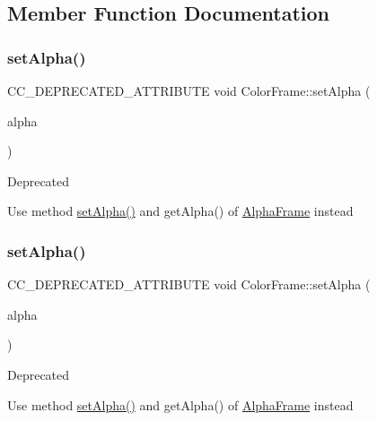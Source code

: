 \subsection{Member Function Documentation}
\mbox{\label{classColorFrame_a9ff6186646bd482ba3d4fe0e242739d6}} 
\subsubsection{\texorpdfstring{set\+Alpha()}{setAlpha()}\hspace{0.1cm}{\footnotesize\ttfamily [1/2]}}
{\footnotesize\ttfamily C\+C\+\_\+\+D\+E\+P\+R\+E\+C\+A\+T\+E\+D\+\_\+\+A\+T\+T\+R\+I\+B\+U\+TE void Color\+Frame\+::set\+Alpha (\begin{DoxyParamCaption}\item[{G\+Lubyte}]{alpha }\end{DoxyParamCaption})\hspace{0.3cm}{\ttfamily [inline]}}

\begin{DoxyRefDesc}{Deprecated}
\item[\hyperlink{deprecated__deprecated000074}{Deprecated}]Use method \hyperlink{classColorFrame_a9ff6186646bd482ba3d4fe0e242739d6}{set\+Alpha()} and get\+Alpha() of \hyperlink{classAlphaFrame}{Alpha\+Frame} instead \end{DoxyRefDesc}
\mbox{\label{classColorFrame_a9ff6186646bd482ba3d4fe0e242739d6}} 
\subsubsection{\texorpdfstring{set\+Alpha()}{setAlpha()}\hspace{0.1cm}{\footnotesize\ttfamily [2/2]}}
{\footnotesize\ttfamily C\+C\+\_\+\+D\+E\+P\+R\+E\+C\+A\+T\+E\+D\+\_\+\+A\+T\+T\+R\+I\+B\+U\+TE void Color\+Frame\+::set\+Alpha (\begin{DoxyParamCaption}\item[{G\+Lubyte}]{alpha }\end{DoxyParamCaption})\hspace{0.3cm}{\ttfamily [inline]}}

\begin{DoxyRefDesc}{Deprecated}
\item[\hyperlink{deprecated__deprecated000309}{Deprecated}]Use method \hyperlink{classColorFrame_a9ff6186646bd482ba3d4fe0e242739d6}{set\+Alpha()} and get\+Alpha() of \hyperlink{classAlphaFrame}{Alpha\+Frame} instead \end{DoxyRefDesc}


